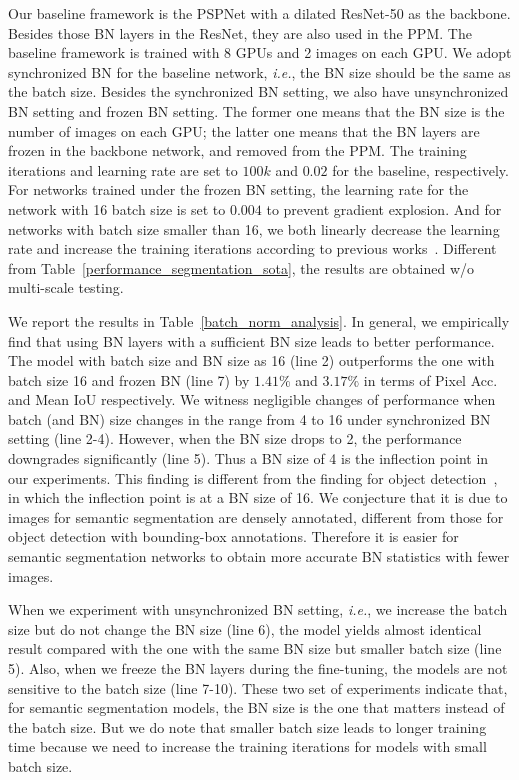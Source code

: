 Our baseline framework is the PSPNet with a dilated ResNet-50 as the backbone. Besides those BN layers in the ResNet, they are also used in the PPM. The baseline framework is trained with 8 GPUs and 2 images on each GPU. We adopt synchronized BN for the baseline network, \emph{i.e.}, the BN size should be the same as the batch size. Besides the synchronized BN setting, we also have unsynchronized BN setting and frozen BN setting. The former one means that the BN size is the number of images on each GPU; the latter one means that the BN layers are frozen in the backbone network, and removed from the PPM. The training iterations and learning rate are set to $100k$ and $0.02$ for the baseline, respectively. For networks trained under the frozen BN setting, the learning rate for the network with 16 batch size is set to $0.004$ to prevent gradient explosion. And for networks with batch size smaller than 16, we both linearly decrease the learning rate and increase the training iterations according to previous works~\cite{goyal2017accurate}. Different from Table~\ref{performance_segmentation_sota}, the results are obtained w/o multi-scale testing.

We report the results in Table~\ref{batch_norm_analysis}. In general, we empirically find that using BN layers with a sufficient BN size leads to better performance. The model with batch size and BN size as 16 (line 2) outperforms the one with batch size 16 and frozen BN (line 7) by $1.41\%$ and $3.17\%$ in terms of Pixel Acc. and Mean IoU respectively. We witness negligible changes of performance when batch (and BN) size changes in the range from 4 to 16 under synchronized BN setting (line 2-4). However, when the BN size drops to 2, the performance downgrades significantly (line 5). Thus a BN size of 4 is the inflection point in our experiments. This finding is different from the finding for object detection~\cite{peng2018megdet}, in which the inflection point is at a BN size of 16. We conjecture that it is due to images for semantic segmentation are densely annotated, different from those for object detection with bounding-box annotations. Therefore it is easier for semantic segmentation networks to obtain more accurate BN statistics with fewer images.

When we experiment with unsynchronized BN setting, \emph{i.e.}, we increase the batch size but do not change the BN size (line 6), the model yields almost identical result compared with the one with the same BN size but smaller batch size (line 5). Also, when we freeze the BN layers during the fine-tuning, the models are not sensitive to the batch size (line 7-10). These two set of experiments indicate that, for semantic segmentation models, the BN size is the one that matters instead of the batch size. But we do note that smaller batch size leads to longer training time because we need to increase the training iterations for models with small batch size.

